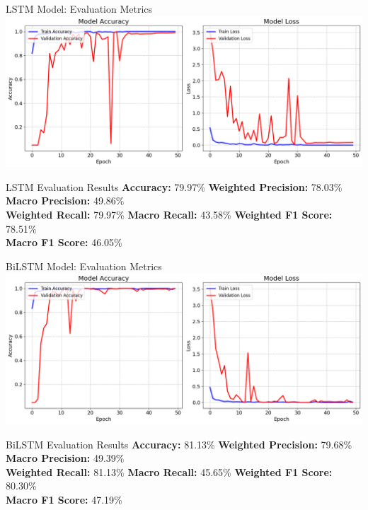 \begin{frame}{LSTM Model: Evaluation Metrics}
	\centering
	\includegraphics[width=0.7\linewidth]{images/paper_2/lstm accuracy and loss plot}  
	\vspace{1em}
	
	\begin{block}{LSTM Evaluation Results}
		\centering
		\textbf{Accuracy:} 79.97\% \hspace{0.5cm}
		\textbf{Weighted Precision:} 78.03\% \hspace{0.5cm}
		\textbf{Macro Precision:} 49.86\% \\
		\textbf{Weighted Recall:} 79.97\% \hspace{0.5cm}
		\textbf{Macro Recall:} 43.58\% \hspace{0.5cm}
		\textbf{Weighted F1 Score:} 78.51\% \\
		\textbf{Macro F1 Score:} 46.05\%
	\end{block}
\end{frame}

\begin{frame}{BiLSTM Model: Evaluation Metrics}
	\centering
	\includegraphics[width=0.7\linewidth]{images/paper_2/BILSTM Accuaracy Plot}   
	\vspace{1em}
	
	\begin{block}{BiLSTM Evaluation Results}
		\centering
		\textbf{Accuracy:} 81.13\% \hspace{0.5cm}
		\textbf{Weighted Precision:} 79.68\% \hspace{0.5cm}
		\textbf{Macro Precision:} 49.39\% \\
		\textbf{Weighted Recall:} 81.13\% \hspace{0.5cm}
		\textbf{Macro Recall:} 45.65\% \hspace{0.5cm}
		\textbf{Weighted F1 Score:} 80.30\% \\
		\textbf{Macro F1 Score:} 47.19\%
	\end{block}
\end{frame}


